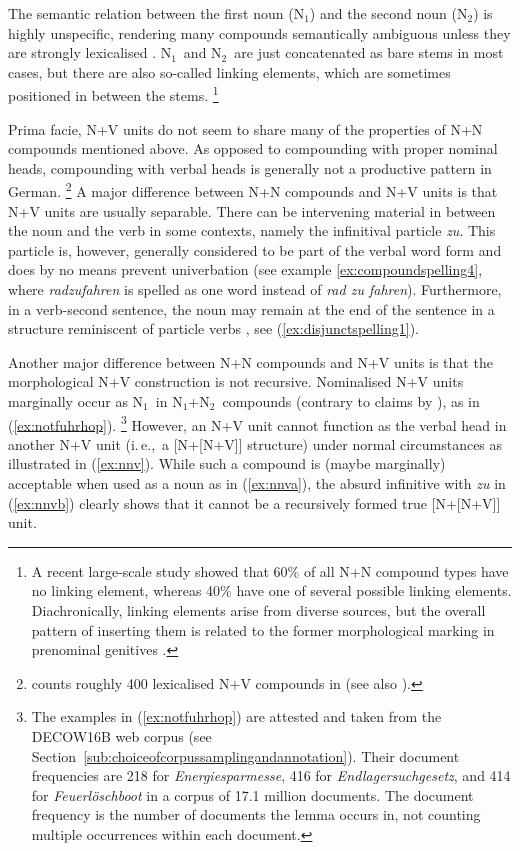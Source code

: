 \documentclass[biblatex, charis, linguex]{glossa}\usepackage{knitr}
\newcommand{\ie}{i.\,e.,\ }
\newcommand{\Sub}[1]{\ensuremath{\mathrm{_{#1}}}}
\newcommand{\Ni}{N\Sub{1}}
\newcommand{\Nii}{N\Sub{2}}
\begin{document}
The semantic relation between the first noun (\Ni) and the second noun (\Nii) is highly unspecific, rendering many compounds semantically ambiguous unless they are strongly lexicalised \parencite[252]{Klos2011}.
\Ni\ and \Nii\ are just concatenated as bare stems in most cases, but there are also so-called linking elements, which are sometimes positioned in between the stems.%
\footnote{A recent large-scale study \parencite[339]{SchaeferPankratz2018} showed that 60\% of all N+N compound types have no linking element, whereas 40\% have one of several possible linking elements.
Diachronically, linking elements arise from diverse sources, but the overall pattern of inserting them is related to the former morphological marking in prenominal genitives \parencite[55--57]{NueblingEa2017}.}

Prima facie, N+V units do not seem to share many of the properties of N+N compounds mentioned above.
As opposed to compounding with proper nominal heads, compounding with verbal heads is generally not a productive pattern in German.%
\footnote{\citet{Guenther1997} counts roughly 400 lexicalised N+V compounds in \citet{Muthmann1988} (see also \citealt[245]{Eisenberg2020a}).}
A major difference between N+N compounds and N+V units is that N+V units are usually separable.
There can be intervening material in between the noun and the verb in some contexts, namely the infinitival particle \textit{zu}.
This particle is, however, generally considered to be part of the verbal word form \citep[211]{Eisenberg2020a} and does by no means prevent univerbation (see example \ref{ex:compoundspelling4}, where \textit{rad\-zu\-fahren} is spelled as one word instead of \textit{rad zu fahren}).
Furthermore, in a verb-second sentence, the noun may remain at the end of the sentence in a structure reminiscent of particle verbs \parencite[603]{Fortmann2015}, see (\ref{ex:disjunctspelling1}).

Another major difference between N+N compounds and N+V units is that the morphological N+V construction is not recursive.
Nominalised N+V units marginally occur as \Ni\ in \Ni+\Nii\ compounds (contrary to claims by \citealt[54]{Fuhrhop2007}), as in (\ref{ex:notfuhrhop}).%
\footnote{The examples in (\ref{ex:notfuhrhop}) are attested and taken from the DECOW16B web corpus (see Section~\ref{sub:choiceofcorpussamplingandannotation}).
Their document frequencies are 218 for \textit{Energiesparmesse}, 416 for \textit{Endlagersuchgesetz}, and 414 for \textit{Feuerlöschboot} in a corpus of 17.1 million documents.
The document frequency is the number of documents the lemma occurs in, not counting multiple occurrences within each document.}
However, an N+V unit cannot function as the verbal head in another N+V unit (\ie a [N+[N+V]] structure) under normal circumstances as illustrated in (\ref{ex:nnv}).
While such a compound is (maybe marginally) acceptable when used as a noun as in  (\ref{ex:nnva}), the absurd infinitive with \textit{zu} in (\ref{ex:nnvb}) clearly shows that it cannot be a recursively formed true [N+[N+V]] unit.
\end{document}
